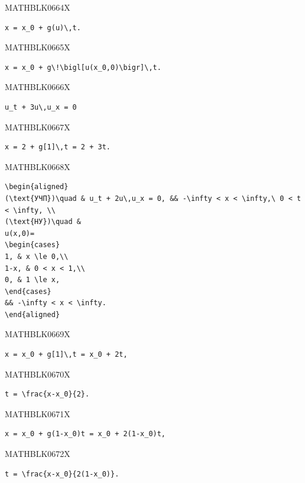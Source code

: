 \documentclass[
  ukrainian,
]{article}
\begin{document}
MATHBLK0664X

\begin{verbatim}
x = x_0 + g(u)\,t.
\end{verbatim}

MATHBLK0665X

\begin{verbatim}
x = x_0 + g\!\bigl[u(x_0,0)\bigr]\,t.
\end{verbatim}

MATHBLK0666X

\begin{verbatim}
u_t + 3u\,u_x = 0
\end{verbatim}

MATHBLK0667X

\begin{verbatim}
x = 2 + g[1]\,t = 2 + 3t.
\end{verbatim}

MATHBLK0668X

\begin{verbatim}
\begin{aligned}
(\text{УЧП})\quad & u_t + 2u\,u_x = 0, && -\infty < x < \infty,\ 0 < t < \infty, \\
(\text{НУ})\quad &
u(x,0)=
\begin{cases}
1, & x \le 0,\\
1-x, & 0 < x < 1,\\
0, & 1 \le x,
\end{cases}
&& -\infty < x < \infty.
\end{aligned}
\end{verbatim}

MATHBLK0669X

\begin{verbatim}
x = x_0 + g[1]\,t = x_0 + 2t,
\end{verbatim}

MATHBLK0670X

\begin{verbatim}
t = \frac{x-x_0}{2}.
\end{verbatim}

MATHBLK0671X

\begin{verbatim}
x = x_0 + g(1-x_0)t = x_0 + 2(1-x_0)t,
\end{verbatim}

MATHBLK0672X

\begin{verbatim}
t = \frac{x-x_0}{2(1-x_0)}.
\end{verbatim}
\end{document}

